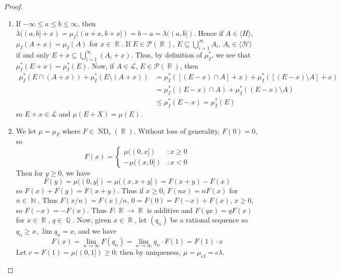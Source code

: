 \documentclass[11pt, a4paper]{memoir}
\DeclareMathOperator{\N}{{\mathbb{N}}}
\DeclareMathOperator{\Q}{{\mathbb{Q}}}
\DeclareMathOperator{\R}{{\mathbb{R}}}
\theoremstyle{change}
\theoremstyle{plain}
\theoremstyle{nonumberplain}
\newtheorem{proof}{Proof}
\DeclareMathOperator{\ND}{ND}
\numberwithin{equation}{section}
\begin{document}
\begin{proof}
    \begin{enumerate}[r]
        \item If $-\infty\leq a\leq b\leq\infty$, then $\lambda((a,b]+x)=\mu_I((a+x,b+x])=b-a=\lambda((a,b])$.
            Hence if $A\in\langle H\rangle$, $\mu_I(A+x)=\mu_I(A)$ for $x\in\R$.
            If $E\in\mathcal{P}(\R)$, $E\subseteq\bigcup_{i=1}^\infty A_i$, $A_i\in\langle\mathcal{H}\rangle$ if and only $E+x\subseteq\bigcup_{i=1}^\infty(A_i+x)$.
            Thus, by definition of $\mu_I^*$, we see that $\mu_I^*(E+x)=\mu_I^*(E)$.
            Now, if $A\in\mathcal{L}$, $E\in\mathcal{P}(\R)$, then
            \begin{align*}
                \mu_I^*(E\cap (A+x))+\mu_I^*(E\setminus(A+x)) &= \mu_I^*([(E-x)\cap A]+x)+\mu_I^*([(E-x)\setminus A]+x)\\
                                                              &= \mu_I^*((E-x)\cap A)+\mu_I^*((E-x)\setminus A)\\
                                                              &\leq \mu_I^*(E-x)=\mu_I^*(E)
            \end{align*}
            so $E+x\in\mathcal{L}$ and $\mu(E+X)=\mu(E)$.

        \item We let $\mu=\mu_F$ where $F\in\ND_r(\R)$.
            Without loss of generality, $F(0)=0$, so
            \begin{equation*}
                F(x)=\begin{cases} \mu((0,x]) &:x\geq 0\\-\mu((x,0])&:x<0\end{cases}
            \end{equation*}
            Then for $y\geq 0$, we have
            \begin{equation*}
                F(y)=\mu((0,y])=\mu((x,x+y])=F(x+y)-F(x)
            \end{equation*}
            so $F(x)+F(y)=F(x+y)$.
            Thus if $x\geq 0$, $F(nx)=nF(x)$ for $n\in\N$.
            Thus $F(x/n)=F(x)/n$, $0=F(0)=F(-x)+F(x)$, $x\geq 0$, so $F(-x)=-F(x)$.
            Thus $F:\R\to\R$ is additive and $F(qx)=qF(x)$ for $x\in\R$, $q\in\Q$.
            Now, given $x\in\R$, let $(q_n)$ be a rational sequence so $q_n\geq x$, $\lim q_n=x$, and we have
            \begin{equation*}
                F(x)=\lim_{n\to\infty}F(q_n)=\lim_{n\to\infty}q_n\cdot F(1)=F(1)\cdot x
            \end{equation*}
            Let $c=F(1)=\mu((0,1])\geq 0$; then by uniqueness, $\mu=\mu_{cI}=c\lambda$.
    \end{enumerate}
\end{proof}
\end{document}
